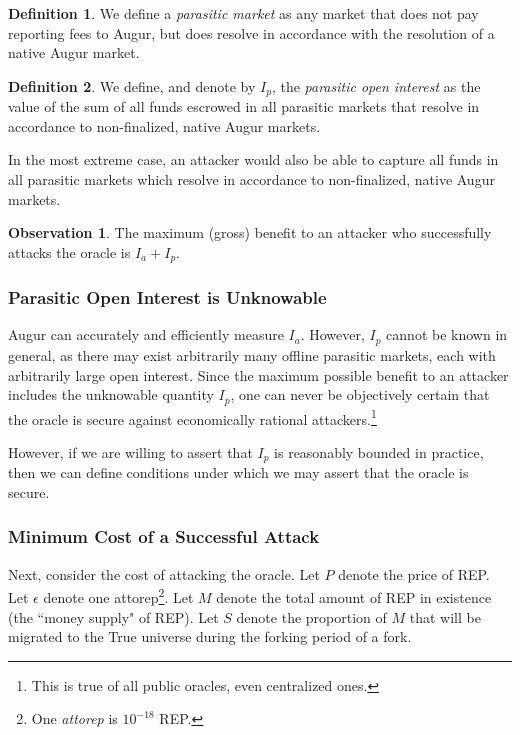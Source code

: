\documentclass[floatfix,reprint,nofootinbib,amsmath,amssymb,epsfig,pre,floats,letterpaper,groupedaffiliation]{revtex4-1}
\theoremstyle{definition}
\newtheorem{observation}{Observation}
\theoremstyle{definition}
\newtheorem{definition}{Definition}
\begin{document}
\begin{definition}
We define a \textit{parasitic market} as any market that does not pay reporting fees to Augur, but does resolve in accordance with the resolution of a native Augur market.
\end{definition}

\begin{definition}
We define, and denote by $I_p$, the \textit{parasitic open interest} as the value of the sum of all funds escrowed in all parasitic markets that resolve in accordance to non-finalized, native Augur markets.
\end{definition}

In the most extreme case, an attacker would also be able to capture all funds in all parasitic markets which resolve in accordance to non-finalized, native Augur markets.

\begin{observation}
The maximum (gross) benefit to an attacker who successfully attacks the oracle is $I_a + I_p$.
\end{observation}

\subsubsection{Parasitic Open Interest is Unknowable}

Augur can accurately and efficiently measure $I_a$.  However, $I_p$ cannot be known in general, as there may exist arbitrarily many offline parasitic markets, each with arbitrarily large open interest.  Since the maximum possible benefit to an attacker includes the unknowable quantity $I_p$, one can never be objectively certain that the oracle is secure against economically rational attackers.\footnote{This is true of all public oracles, even centralized ones.}

However, if we are willing to assert that $I_p$ is reasonably bounded in practice, then we can define conditions under which we may assert that the oracle is secure.

\subsubsection{Minimum Cost of a Successful Attack}

Next, consider the cost of attacking the oracle.  Let $P$ denote the price of REP. Let $\epsilon$ denote one attorep\footnote{One \textit{attorep} is $10^{-18}$ REP.}.  Let $M$ denote the total amount of REP in existence (the ``money supply" of REP).  Let $S$ denote the proportion of $M$ that will be migrated to the True universe during the forking period of a fork.
\end{document}
